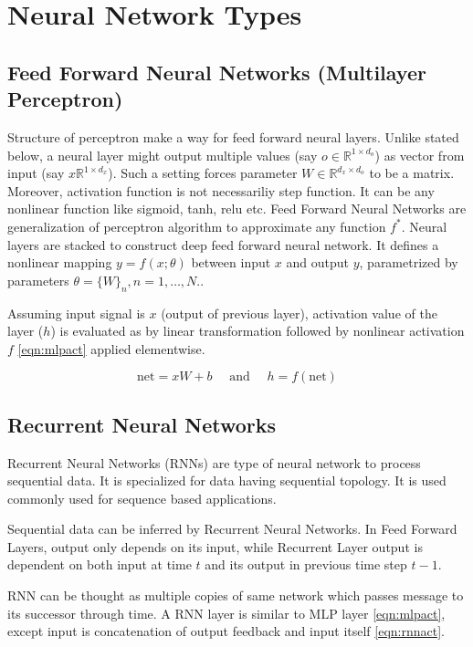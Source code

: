 
\section{Neural Network Types}
\label{sec:nnet_types}

\subsection{Feed Forward Neural Networks (Multilayer Perceptron)}
Structure of perceptron make a way for feed forward neural layers. Unlike stated below, a neural layer might output multiple values (say $o \in \mathbb{R}^{1 \times d_o}$) as vector from input (say $x \mathbb{R}^{1 \times d_x}$). Such a setting forces parameter $W \in \mathbb{R}^{d_x \times d_o} $ to be a matrix. Moreover, activation function is not necessariliy step function. It can be any nonlinear function like sigmoid, tanh, relu etc. Feed Forward Neural Networks are generalization of perceptron algorithm to approximate any function $f^*$. Neural layers are stacked to construct deep feed forward neural network. It defines a nonlinear mapping $y=f(x;\theta)$ between input $x$ and output $y$, parametrized by parameters $\theta = \{W\}_n,n=1,…,N.$.

Assuming input signal is $x$ (output of previous layer), activation value of the layer ($h$) is evaluated as by linear transformation followed by nonlinear activation $f$ \eqref{eqn:mlpact} applied elementwise.

\begin{equation}
\label{eqn:mlpact}
\text{net} = x W + b \quad \text{ and }\quad  h = f(\text{net})
\end{equation}

\subsection{Recurrent Neural Networks}
Recurrent Neural Networks (RNNs) \cite{rumelhart_learning_1986} are type of neural network to process sequential data. It is specialized for data having sequential topology. It is used commonly used for sequence based applications.

Sequential data can be inferred by Recurrent Neural Networks. In Feed Forward Layers, output only depends on its input, while Recurrent Layer output is dependent on both input at time $t$ and its output in previous time step $t-1$.

RNN can be thought as multiple copies of same network which passes message to its successor through time. A RNN layer is similar to MLP layer \ref{eqn:mlpact}, except input is concatenation of output feedback and input itself \ref{eqn:rnnact}.

